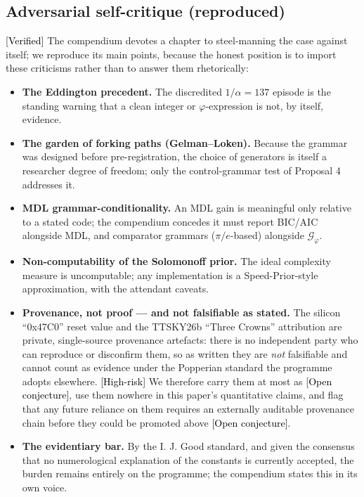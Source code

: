 \documentclass[11pt]{article}
\newcommand{\Verified}{\textcolor{black}{[Verified]}}
\newcommand{\Conj}{\textcolor{black}{[Open conjecture]}}
\newcommand{\Risk}{\textcolor{black}{[High-risk]}}
\newcommand{\phigr}{\varphi}
\begin{document}
\subsection{Adversarial self-critique (reproduced)}\label{sec:critique}
\Verified{} The compendium devotes a chapter to steel-manning the case against itself; we reproduce its main points, because the honest position is to import these criticisms rather than to answer them rhetorically:
\begin{itemize}[leftmargin=*]
\item \textbf{The Eddington precedent.} The discredited $1/\alpha = 137$ episode is the standing warning that a clean integer or $\phigr$-expression is not, by itself, evidence.
\item \textbf{The garden of forking paths (Gelman--Loken).} Because the grammar was designed before pre-registration, the choice of generators is itself a researcher degree of freedom; only the control-grammar test of Proposal 4 addresses it.
\item \textbf{MDL grammar-conditionality.} An MDL gain is meaningful only relative to a stated code; the compendium concedes it must report BIC/AIC alongside MDL, and comparator grammars ($\pi/e$-based) alongside $\mathcal{G}_{\phigr}$.
\item \textbf{Non-computability of the Solomonoff prior.} The ideal complexity measure is uncomputable; any implementation is a Speed-Prior-style approximation, with the attendant caveats.
\item \textbf{Provenance, not proof --- and not falsifiable as stated.} The silicon ``0x47C0'' reset value and the TTSKY26b ``Three Crowns'' attribution are private, single-source provenance artefacts: there is no independent party who can reproduce or disconfirm them, so as written they are \emph{not} falsifiable and cannot count as evidence under the Popperian standard the programme adopts elsewhere. \Risk{} We therefore carry them at most as \Conj{}, use them nowhere in this paper's quantitative claims, and flag that any future reliance on them requires an externally auditable provenance chain before they could be promoted above \Conj{}.
\item \textbf{The evidentiary bar.} By the I. J. Good standard, and given the consensus that no numerological explanation of the constants is currently accepted, the burden remains entirely on the programme; the compendium states this in its own voice.
\end{itemize}
\end{document}
